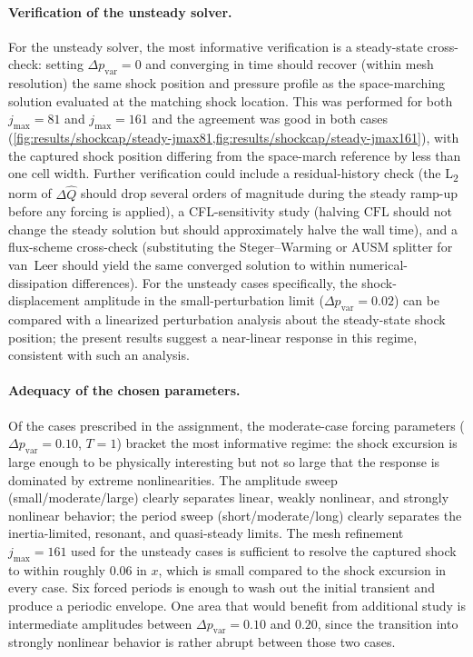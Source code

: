 \paragraph{Verification of the unsteady solver.}
For the unsteady solver, the most informative verification is a steady-state cross-check: setting \(\Delta p_\text{var} = 0\) and converging in time should recover (within mesh resolution) the same shock position and pressure profile as the space-marching solution evaluated at the matching shock location. This was performed for both \(j_\text{max} = 81\) and \(j_\text{max} = 161\) and the agreement was good in both cases (\cref{fig:results/shockcap/steady-jmax81,fig:results/shockcap/steady-jmax161}), with the captured shock position differing from the space-march reference by less than one cell width. Further verification could include a residual-history check (the L\textsubscript{2} norm of \(\Delta \hat Q\) should drop several orders of magnitude during the steady ramp-up before any forcing is applied), a CFL-sensitivity study (halving \(\mathrm{CFL}\) should not change the steady solution but should approximately halve the wall time), and a flux-scheme cross-check (substituting the Steger--Warming or AUSM splitter for van~Leer should yield the same converged solution to within numerical-dissipation differences). For the unsteady cases specifically, the shock-displacement amplitude in the small-perturbation limit (\(\Delta p_\text{var} = 0.02\)) can be compared with a linearized perturbation analysis about the steady-state shock position; the present results suggest a near-linear response in this regime, consistent with such an analysis.

\paragraph{Adequacy of the chosen parameters.}
Of the cases prescribed in the assignment, the moderate-case forcing parameters (\(\Delta p_\text{var} = 0.10\), \(T = 1\)) bracket the most informative regime: the shock excursion is large enough to be physically interesting but not so large that the response is dominated by extreme nonlinearities. The amplitude sweep (small/moderate/large) clearly separates linear, weakly nonlinear, and strongly nonlinear behavior; the period sweep (short/moderate/long) clearly separates the inertia-limited, resonant, and quasi-steady limits. The mesh refinement \(j_\text{max} = 161\) used for the unsteady cases is sufficient to resolve the captured shock to within roughly 0.06 in \(x\), which is small compared to the shock excursion in every case. Six forced periods is enough to wash out the initial transient and produce a periodic envelope. One area that would benefit from additional study is intermediate amplitudes between \(\Delta p_\text{var} = 0.10\) and \(0.20\), since the transition into strongly nonlinear behavior is rather abrupt between those two cases.

